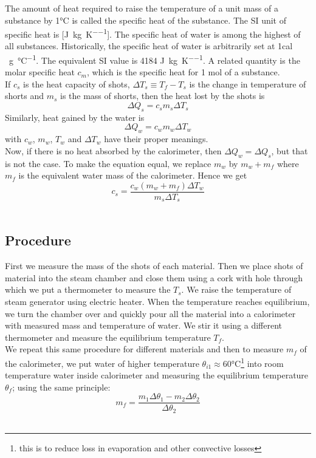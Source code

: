 \documentclass[%
 sor,
 jor,
 amsmath,amssymb,
 reprint,%
]{revtex4-2}
\begin{document}
The amount of heat required to raise the temperature of a unit mass of a substance by 1\si{\celsius} is called the
specific heat of the substance. The SI unit of specific heat is [\si{\joule\per\kilogram\per\kelvin}]. The specific heat of water is among the highest of all substances. Historically, the specific heat of water is arbitrarily set at 1cal \si{\per\gram\per\celsius}. The equivalent SI value is 4184 \si{\joule\per\kilogram\per\kelvin}. A related quantity is the molar specific heat $c_m$, which is the specific heat for 1  \si{\mole} of a substance. \\

If $c_s$ is the heat capacity of shots, $\Delta T_s \equiv T_f -T_s$ is the change in temperature of shorts and $m_s$ is the mass of shorts, then the heat lost by the shots is
$$\Delta Q_s = c_s m_s \Delta T_s$$
Similarly, heat gained by the water is
$$\Delta Q_w = c_w m_ w\Delta T_w$$
with $c_w$, $m_w$, $T_w$ and $\Delta T_w$ have their proper meanings.  \\ 

Now, if there is no heat absorbed by the calorimeter, then $\Delta Q_w = \Delta Q_s$, but that is not the case. To make the equation equal, we replace $m_w$ by $m_w+m_f$ where $m_f$ is the equivalent water mass of the calorimeter. Hence we get
\begin{equation}
c_s = \frac{c_w(m_w +m_f)\Delta T_w}{m_s \Delta T_s}
\end{equation} \\

\subsection{Procedure}
First we measure the mass of the shots of each material. Then we place shots of material into the steam chamber and close them using a cork with hole through which we put a thermometer to measure the $T_s$. We raise the temperature of steam generator using electric heater. When the temperature reaches equilibrium, we turn the chamber over and quickly pour all the material into a calorimeter with measured mass and temperature of water. We stir it using a different thermometer and measure the equilibrium temperature $T_f$. \\
We repeat this same procedure for different materials and then to measure $m_f$ of the calorimeter, we put water of higher temperature $\theta_{i1} \approx 60$\si{\celsius}\footnote{this is to reduce loss in evaporation and other convective losses} into room temperature water inside calorimeter and measuring the equilibrium temperature $\theta_f$; using the same principle:
\begin{equation}
m_f = \frac{m_1\Delta \theta_1 - m_2 \Delta \theta_2}{\Delta \theta_2}
\end{equation} \\
\end{document}
